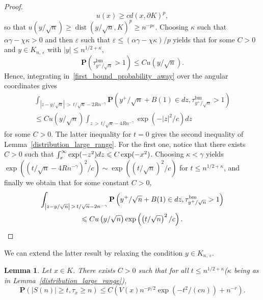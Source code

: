 \documentclass[10pt]{amsart}
\newtheorem{lemm}[theo]{Lemma}\newtheorem{prop}[theo]{Proposition}\newtheorem{coro}[theo]{Corollary}\newtheorem{conj}[theo]{Conjecture}
\theoremstyle{definition}\newtheorem{defi}[theo]{Definition}\newtheorem{rema}[theo]{Remark}\newtheorem{exam}[theo]{Example}\newtheorem{exem}[theo]{Example}\newtheorem{nota}[theo]{Notation}
\DeclareMathOperator{\bm}{bm}
\DeclareMathOperator{\dist}{dist}
\newcommand{\pr}{\mathbf{P}}
\renewcommand{\epsilon}{\varepsilon}
\renewcommand{\leq}{\leqslant}
\renewcommand{\geq}{\geqslant}
\begin{document}
\begin{proof}
\begin{equation}
u(x)\geq cd(x,\partial K)^{p},
\end{equation}
so that $u(y/\sqrt{n})\geq \dist(y/\sqrt{n},{K})^{p}\geq n^{-p\epsilon}$. Choosing $\kappa$ such that $\alpha\gamma-\chi\kappa>0$ and then $\epsilon$ such that $\epsilon\leq (\alpha\gamma-\chi\kappa)/p$ yields that for some $C>0$ and $y\in{K}_{n,\,\epsilon}$ with $| y|\leq n^{1/2+\kappa}$,
\[
\pr\left(\tau^{\bm}_{y^{+}/\sqrt{n}}>1\right)\leq Cu\left(y/\sqrt{n}\right).
\]
Hence, integrating in~\eqref{first_bound_probability_away} over the angular coordinates gives
\begin{multline*}
\int_{\left|z-y/\sqrt{n}\right|\,>\,t/\sqrt{n}-2Rn^{-\gamma}}\pr\left(y^{+}/\sqrt{n}+B(1)\in dz,\tau^{\bm}_{y^{+}/\sqrt{n}}>1\right)\\
\leq Cu\left(y/\sqrt{n}\right)\int_{z\,>\,t/\sqrt{n}-4Rn^{-\gamma}}\exp\left(-|z|^{2}/c\right)dz
\end{multline*}
for some $C>0$. The latter inequality for $t=0$ gives the second inequality of Lemma~\ref{distribution_large_range}. For the first one, notice that there exists $C>0$ such that $\int_{x}^{\infty}\exp(-z^{2})dz\linebreak\leq C\exp(-x^{2})$. Choosing $\kappa<\gamma$ yields $\exp((t/\sqrt{n}-4Rn^{-\gamma})^{2}/c)\sim \exp((t/\sqrt{n})^{2}/c)$ for $t\leq n^{1/2+\kappa}$, and finally we obtain that for some constant $C>0$,
\begin{multline*}
\int_{\left|z-y/\sqrt{n}\right|\,>\,t/\sqrt{n}-2n^{-\gamma}}\pr\left(y^{+}/\sqrt{n}+B(1)\in dz,\tau^{\bm}_{y^{+}/\sqrt{n}}>1\right)\\
\leq C u\left(y/\sqrt{n}\right)\exp\left(\left(t/\sqrt{n}\right)^{2}/c\right).\qedhere
\end{multline*}
\end{proof}

We can extend the latter result by relaxing the condition $y\in{K}_{n,\,\epsilon}$.

\begin{lemm}\label{boundAwayFixedX}
Let $x\in{K}$. There exists $C>0$ such that for all $t\leq n^{1/2+\kappa}$\linebreak($\kappa$ being as in Lemma~\ref{distribution_large_range}),
\[
\pr\left(|S(n)| \geq t, \tau_{x}\geq n\right)\leq C\left(V(x)n^{-p/2}\exp\left(-t^{2}/(cn)\right)+ n^{-r}\right).
\]
\end{lemm}
\end{document}
